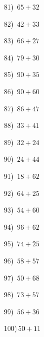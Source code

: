 \documentclass{article}
\begin{document}
\begin{multicols}{2}
81)$\,\,\,65+32$ \par 
82)$\,\,\,42+33$ \par 
83)$\,\,\,66+27$ \par 
84)$\,\,\,79+30$ \par 
85)$\,\,\,90+35$ \par 
86)$\,\,\,90+60$ \par 
87)$\,\,\,86+47$ \par 
88)$\,\,\,33+41$ \par 
89)$\,\,\,32+24$ \par 
90)$\,\,\,24+44$ \par 
91)$\,\,\,18+62$ \par 
92)$\,\,\,64+25$ \par 
93)$\,\,\,54+60$ \par 
94)$\,\,\,96+62$ \par 
95)$\,\,\,74+25$ \par 
96)$\,\,\,58+57$ \par 
97)$\,\,\,50+68$ \par 
98)$\,\,\,73+57$ \par 
99)$\,\,\,56+36$ \par 
100)$\,50+11$ \par 
\end{multicols} 
\end{document}
